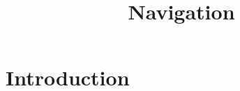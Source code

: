 \documentclass{article}
\title{Navigation}
\begin{document}
\maketitle

\section{Introduction}
\end{document}
